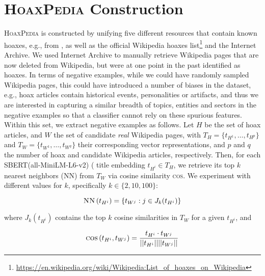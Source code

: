 \section{\textsc{HoaxPedia} Construction}
\label{sec:dataset}
\textsc{HoaxPedia} is constructed by unifying five different resources that contain known hoaxes, e.g., from \citet{kumar2016disinformation,elebiary2023role}, as well as the official Wikipedia hoaxes list\footnote{\url{https://en.wikipedia.org/wiki/Wikipedia:List_of_hoaxes_on_Wikipedia}} and the Internet Archive. We used Internet Archive to manually retrieve Wikipedia pages that are now deleted from Wikipedia, but were at one point in the past identified as hoaxes.   In terms of negative examples, while we could have randomly sampled Wikipedia pages, this could have introduced a number of biases in the dataset, e.g., hoax articles contain historical events, personalities or artifacts, and thus we are interested in capturing a similar breadth of topics, entities and sectors in the negative examples so that a classifier cannot rely on these spurious features.  Within this set, we extract negative examples as follows. Let $H$ be the set of hoax articles, and $W$ the set of candidate \textit{real} Wikipedia pages, with $T_H = \lbrace t_{H^{1}}, \dots, t_{H^{p}} \rbrace$ and $T_W = \lbrace t_{W^{1}}, \dots, t_{W^{q}} \rbrace$ their corresponding vector representations, and $p$ and $q$ the number of hoax and candidate Wikipedia articles, respectively. Then, for each SBERT(all-MiniLM-L6-v2) ( \citep{reimers2019sentence} title embedding $t_{H^i} \in T_H$, we retrieve its top $k$ nearest neighbors (\textsc{NN}) from $T_W$ via cosine similarity \textsc{cos}. We experiment with different values for $k$, specifically $k \in \lbrace 2, 10, 100 \rbrace$:

\[
\mbox{\textsc{NN}}\left(t_{H^i}\right) = \lbrace t_{W^j} : j \in J_k(t_{H^i}) \rbrace 
\]

where $J_k(t_{H^i})$ contains the top $k$ cosine similarities in $T_W$ for a given $t_{H^i}$, and 

\[
\mbox{\textsc{cos}}\left(t_{H^i}, t_{W^j}\right) = \frac{t_{H^i} \cdot t_{W^j}}{\vert\vert t_{H^i} \vert\vert \vert\vert t_{W^j} \vert\vert}
\]


